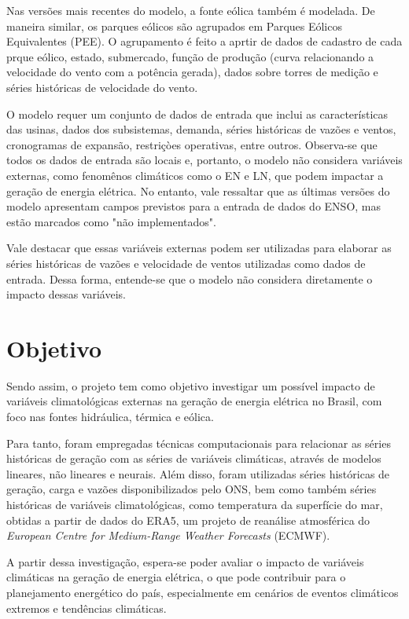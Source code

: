 Nas versões mais recentes do modelo, a fonte eólica também é modelada. De maneira similar, os parques eólicos são agrupados
em Parques Eólicos Equivalentes (PEE). O agrupamento é feito a aprtir de dados de cadastro de cada prque eólico, estado,
submercado, função de produção (curva relacionando a velocidade do vento com a potência gerada), dados sobre torres de
medição e séries históricas de velocidade do vento.

O modelo requer um conjunto de dados de entrada que inclui as características das usinas, dados dos subsistemas, demanda,
séries históricas de vazões e ventos, cronogramas de expansão, restriçòes operativas, entre outros. Observa-se que todos
os dados de entrada são locais e, portanto, o modelo não considera variáveis externas, como fenomênos climáticos como o 
EN e LN, que podem impactar a geração de energia elétrica. No entanto, vale ressaltar que as últimas versões do modelo
apresentam campos previstos para a entrada de dados do ENSO, mas estão marcados como "não implementados".

Vale destacar que essas variáveis externas podem ser utilizadas para elaborar as séries históricas de vazões e velocidade
de ventos utilizadas como dados de entrada. Dessa forma, entende-se que o modelo não considera diretamente o impacto 
dessas variáveis.

\section{Objetivo}
Sendo assim, o projeto tem como objetivo investigar um possível impacto de variáveis climatológicas externas na geração 
de energia elétrica no Brasil, com foco nas fontes hidráulica, térmica e eólica. 

Para tanto, foram empregadas técnicas computacionais para relacionar as séries históricas de geração com as séries de variáveis 
climáticas, através de modelos lineares, não lineares e neurais. Além disso, foram utilizadas séries históricas de geração, 
carga e vazões disponibilizados pelo ONS, bem como também séries históricas de variáveis climatológicas, como temperatura 
da superfície do mar, obtidas a partir de dados do ERA5, um projeto de reanálise atmosférica do \textit{European Centre for Medium-Range Weather Forecasts} (ECMWF).

A partir dessa investigação, espera-se poder avaliar o impacto de variáveis climáticas na geração de energia elétrica,
o que pode contribuir para o planejamento energético do país, especialmente em cenários de eventos climáticos extremos e
tendências climáticas.

